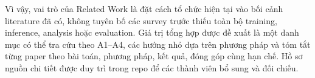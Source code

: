 Vì vậy, vai trò của Related Work là đặt cách tổ chức hiện tại vào bối cảnh literature đã có, không tuyên bố các survey trước thiếu toàn bộ training, inference, analysis hoặc evaluation. Giá trị tổng hợp được đề xuất là một danh mục có thể tra cứu theo A1–A4, các hướng nhỏ dựa trên phương pháp và tóm tắt từng paper theo bài toán, phương pháp, kết quả, đóng góp cùng hạn chế. Hồ sơ nguồn chi tiết được duy trì trong repo để các thành viên bổ sung và đối chiếu.
